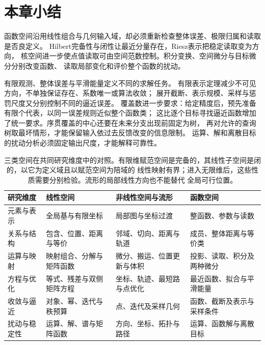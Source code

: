 \section{本章小结}
\label{sec:functional-summary}
\label{sec:functional-analysis-approximation-summary}


函数空间沿用线性组合与几何输入域，却必须重新检查整体误差、极限归属和读取是否良定义。
Hilbert完备性与闭性让最近分量存在，Riesz表示把稳定读取变为方向，
核空间进一步使点值读取可由空间范数控制。积分变换、空间微分与目标微分分别改变函数、
读取局部变化和评价整个函数的扰动。

有限观测、整体误差与平滑能量定义不同的求解任务。
有限表示定理减少不可见方向，不单独保证存在、系数唯一或算法收敛；
展开截断、表示规模、采样与惩罚尺度又分别控制不同的逼近误差。
覆盖数进一步要求：给定精度后，预先准备有限个代表，以同一误差规则近似整个函数类；
这比逐个目标寻找逼近函数增加了统一要求。序贯覆盖的中心还要在未来分支出现前固定为树，
再对允许的查询树取最坏情形，才能保留输入依过去反馈改变的信息限制。
运算、解和离散目标的扰动分析必须固定输出尺度，才能解释可靠性。

\begin{table}[htbp]
\centering
\begin{tabularx}{\linewidth}{@{}lXXX@{}}
\toprule
研究维度 & 线性空间 & 非线性空间与流形 & 函数空间\\
\midrule
元素与表示 & 全局基与有限坐标 & 局部图与坐标过渡 & 整函数、参数与读数\\
关系与结构 & 包含、位置、距离与等价 & 邻域、切向、距离与轨道 & 成员、整体距离与等价类\\
运算与映射 & 映射组合、分解与矩阵函数 & 微分、搬运、位置更新与体积 & 投影、读取、积分及两种微分\\
方程与优化 & 等式、残差与双侧矩阵方程 & 坐标、轨迹、最短路与点优化 & 最近函数、拟合与平滑能量\\
收敛与逼近 & 对象、幂、迭代与秩预算 & 点、迭代及采样几何 & 函数、截断及表示与采样条件\\
扰动与稳定性 & 运算、解、谱与矩阵函数 & 方向、坐标、拓扑与路径 & 运算、函数解与离散目标\\
\bottomrule
\end{tabularx}
\caption{三类空间在共同研究维度中的对照。有限维赋范空间是完备的，其线性子空间是闭的，以它为定义域且以赋范空间为陪域的
线性映射有界；进入无限维后，这些性质需要分别检验。流形的局部线性方向也不能替代
全局可行位置。}
\label{tab:spaces-six-dimension-comparison}
\end{table}
